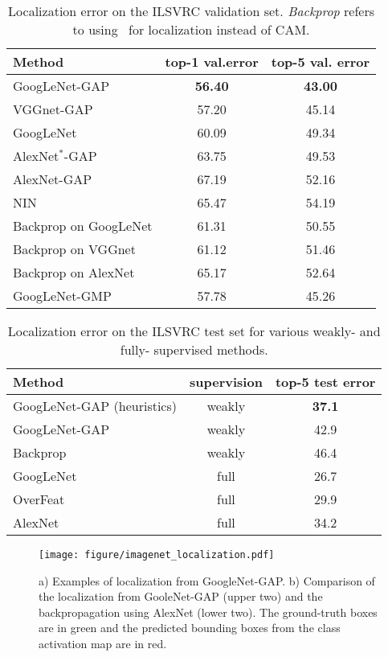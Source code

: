 \documentclass[10pt,twocolumn,letterpaper]{article}
\begin{document}
\begin{table}\caption{Localization error on the ILSVRC validation set. \textit{Backprop} refers to using~\cite{simonyan2013deep} for localization instead of CAM.}
\label{networkvalidationset}
\centering
\footnotesize
\begin{tabular}{ l | c | c }   
  \hline  
  \hline
  Method & top-1 val.error & top-5 val. error \\
    \hline  
  GoogLeNet-GAP&  \textbf{56.40} & \textbf{43.00} \\
  VGGnet-GAP& 57.20 & 45.14 \\
  GoogLeNet & 60.09 & 49.34\\      
  AlexNet$^{*}$-GAP & 63.75 & 49.53 \\     
  AlexNet-GAP & 67.19 & 52.16 \\
  NIN  & 65.47 & 54.19 \\
    \hline    
  Backprop on GoogLeNet & 61.31 & 50.55 \\  
  Backprop on VGGnet & 61.12 & 51.46 \\
  Backprop on AlexNet & 65.17 & 52.64 \\
  \hline  
    GoogLeNet-GMP  & 57.78 & 45.26 \\
    \hline 
\end{tabular}
\end{table}

\begin{table}\caption{Localization error on the ILSVRC test set for various weakly- and fully- supervised methods.}\label{networktestset}
\centering
\footnotesize
\begin{tabular}{ l | c | c  }
  \hline  
  \hline                       
  Method & supervision &  top-5 test error \\
    \hline  
  GoogLeNet-GAP (heuristics)  & weakly & \textbf{37.1} \\     
  GoogLeNet-GAP  & weakly & 42.9 \\ 
  Backprop \cite{simonyan2013deep} & weakly & 46.4 \\
      \hline 
  GoogLeNet \cite{szegedy2014going} & full & 26.7 \\
  OverFeat \cite{sermanet2013overfeat} & full & 29.9 \\        
  AlexNet \cite{szegedy2014going} & full & 34.2 \\
  \hline  
\end{tabular}
\end{table}

\begin{figure*}
\begin{center}
\texttt{[image: figure/imagenet\_localization.pdf]}
\end{center}
\caption{a) Examples of localization from GoogleNet-GAP. b) Comparison of the localization from GooleNet-GAP (upper two) and the backpropagation using AlexNet (lower two). The ground-truth boxes are in green and the predicted bounding boxes from the class activation map are in red.}
\label{fig:localizationexample}
\end{figure*}
\end{document}
